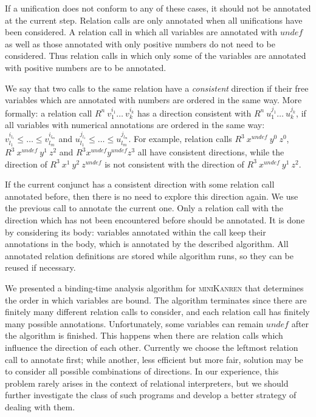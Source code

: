 \documentclass[submission,copyright,creativecommons]{eptcs}
\newcommand{\miniKanren}{\textsc{miniKanren}}
\begin{document}
If a unification does not conform to any of these cases, it should not be annotated at the current step.
Relation calls are only annotated when all unifications have been considered.
A relation call in which all variables are annotated with $undef$ as well as those annotated with only positive numbers do not need to be considered.
Thus relation calls in which only some of the variables are annotated with positive numbers are to be annotated.

We say that two calls to the same relation have a \emph{consistent} direction if their free variables which are annotated with numbers are ordered in the same way.
More formally: a relation call $R^n \ v_1^{i_1} \dots \ v_k^{i_k}$ has a direction consistent with $R^n \ u_1^{j_1} \dots \ u_k^{j_k}$, if all variables with numerical annotations are ordered in the same way: $v_{l_1}^{i_{l_1}} \leq \dots \leq v_{l_m}^{i_{l_m}}$ and $u_{l_1}^{j_{l_1}} \leq \dots \leq u_{l_m}^{j_{l_m}}$. For example, relation calls $R^3 \ x^{undef} \ y^{0} \ z^{0}$, $R^3 \ x^{undef} \ y^{1} \ z^{2}$ and $R^3 x^{undef} y^{undef} z^{3}$ all have consistent directions, while the direction of $R^3 \ x^{1} \ y^{2} \ z^{undef}$ is not consistent with the direction of $R^3 \ x^{undef} \ y^{1} \ z^{2}$.

If the current conjunct has a consistent direction with some relation call annotated before, then there is no need to explore this direction again.
We use the previous call to annotate the current one.
Only a relation call with the direction which has not been encountered before should be annotated.
It is done by considering its body: variables annotated within the call keep their annotations in the body, which is annotated by the described algorithm.
All annotated relation definitions are stored while algorithm runs, so they can be reused if necessary.

We presented a binding-time analysis algorithm for \miniKanren{} that determines the order in which variables are bound.
The algorithm terminates since there are finitely many different relation calls to consider, and each relation call has finitely many possible annotations.
Unfortunately, some variables can remain $undef$ after the algorithm is finished.
This happens when there are relation calls which influence the direction of each other.
Currently we choose the leftmost relation call to annotate first; while another, less efficient but more fair, solution may be to consider all possible combinations of directions.
In our experience, this problem rarely arises in the context of relational interpreters, but we should further investigate the class of such programs and develop a better strategy of dealing with them.



\nocite{*}


\end{document}
